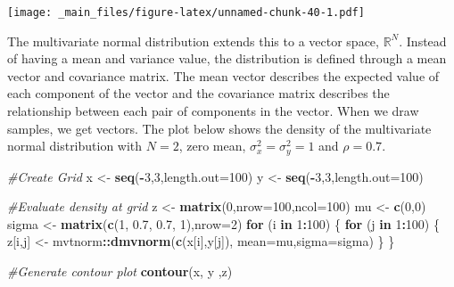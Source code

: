 \documentclass[
]{book}
\newenvironment{Shaded}{\begin{snugshade}}{\end{snugshade}}
\newcommand{\AttributeTok}[1]{\textcolor[rgb]{0.13,0.29,0.53}{#1}}
\newcommand{\CommentTok}[1]{\textcolor[rgb]{0.56,0.35,0.01}{\textit{#1}}}
\newcommand{\ControlFlowTok}[1]{\textcolor[rgb]{0.13,0.29,0.53}{\textbf{#1}}}
\newcommand{\DecValTok}[1]{\textcolor[rgb]{0.00,0.00,0.81}{#1}}
\newcommand{\FloatTok}[1]{\textcolor[rgb]{0.00,0.00,0.81}{#1}}
\newcommand{\FunctionTok}[1]{\textcolor[rgb]{0.13,0.29,0.53}{\textbf{#1}}}
\newcommand{\NormalTok}[1]{#1}
\newcommand{\OtherTok}[1]{\textcolor[rgb]{0.56,0.35,0.01}{#1}}
\newcommand{\SpecialCharTok}[1]{\textcolor[rgb]{0.81,0.36,0.00}{\textbf{#1}}}
\theoremstyle{definition}
\theoremstyle{definition}
\theoremstyle{definition}
\theoremstyle{definition}
\theoremstyle{remark}
\begin{document}
\texttt{[image: \_main\_files/figure-latex/unnamed-chunk-40-1.pdf]}

The multivariate normal distribution extends this to a vector space, \(\mathbb{R}^N\). Instead of having a mean and variance value, the distribution is defined through a mean vector and covariance matrix. The mean vector describes the expected value of each component of the vector and the covariance matrix describes the relationship between each pair of components in the vector. When we draw samples, we get vectors. The plot below shows the density of the multivariate normal distribution with \(N = 2\), zero mean, \(\sigma^2_x = \sigma^2_y = 1\) and \(\rho = 0.7\).

\begin{Shaded}
\begin{Highlighting}[]
\CommentTok{\#Create Grid}
\NormalTok{x }\OtherTok{\textless{}{-}} \FunctionTok{seq}\NormalTok{(}\SpecialCharTok{{-}}\DecValTok{3}\NormalTok{,}\DecValTok{3}\NormalTok{,}\AttributeTok{length.out=}\DecValTok{100}\NormalTok{)}
\NormalTok{y }\OtherTok{\textless{}{-}} \FunctionTok{seq}\NormalTok{(}\SpecialCharTok{{-}}\DecValTok{3}\NormalTok{,}\DecValTok{3}\NormalTok{,}\AttributeTok{length.out=}\DecValTok{100}\NormalTok{)}

\CommentTok{\#Evaluate density at grid}
\NormalTok{z }\OtherTok{\textless{}{-}} \FunctionTok{matrix}\NormalTok{(}\DecValTok{0}\NormalTok{,}\AttributeTok{nrow=}\DecValTok{100}\NormalTok{,}\AttributeTok{ncol=}\DecValTok{100}\NormalTok{)}
\NormalTok{mu }\OtherTok{\textless{}{-}} \FunctionTok{c}\NormalTok{(}\DecValTok{0}\NormalTok{,}\DecValTok{0}\NormalTok{)}
\NormalTok{sigma }\OtherTok{\textless{}{-}} \FunctionTok{matrix}\NormalTok{(}\FunctionTok{c}\NormalTok{(}\DecValTok{1}\NormalTok{, }\FloatTok{0.7}\NormalTok{, }\FloatTok{0.7}\NormalTok{, }\DecValTok{1}\NormalTok{),}\AttributeTok{nrow=}\DecValTok{2}\NormalTok{)}
\ControlFlowTok{for}\NormalTok{ (i }\ControlFlowTok{in} \DecValTok{1}\SpecialCharTok{:}\DecValTok{100}\NormalTok{) \{}
  \ControlFlowTok{for}\NormalTok{ (j }\ControlFlowTok{in} \DecValTok{1}\SpecialCharTok{:}\DecValTok{100}\NormalTok{) \{}
\NormalTok{    z[i,j] }\OtherTok{\textless{}{-}}\NormalTok{ mvtnorm}\SpecialCharTok{::}\FunctionTok{dmvnorm}\NormalTok{(}\FunctionTok{c}\NormalTok{(x[i],y[j]),}
                      \AttributeTok{mean=}\NormalTok{mu,}\AttributeTok{sigma=}\NormalTok{sigma)}
\NormalTok{  \}}
\NormalTok{\}}

\CommentTok{\#Generate contour plot}
\FunctionTok{contour}\NormalTok{(x, y ,z)}
\end{Highlighting}
\end{Shaded}
\end{document}
